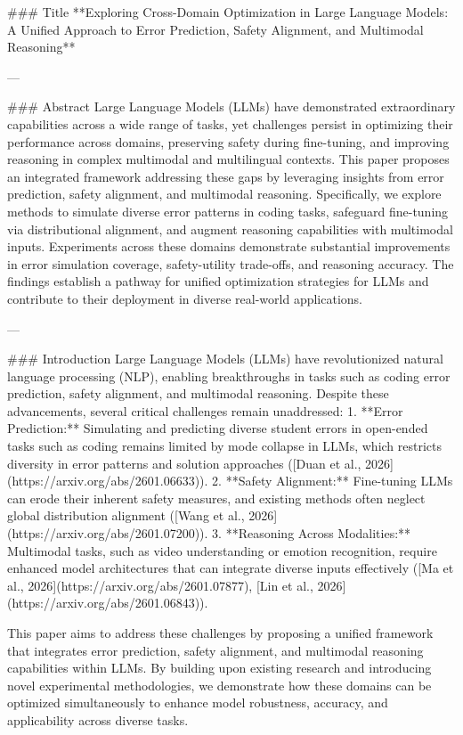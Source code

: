 ### Title  
**Exploring Cross-Domain Optimization in Large Language Models: A Unified Approach to Error Prediction, Safety Alignment, and Multimodal Reasoning**

---

### Abstract  
Large Language Models (LLMs) have demonstrated extraordinary capabilities across a wide range of tasks, yet challenges persist in optimizing their performance across domains, preserving safety during fine-tuning, and improving reasoning in complex multimodal and multilingual contexts. This paper proposes an integrated framework addressing these gaps by leveraging insights from error prediction, safety alignment, and multimodal reasoning. Specifically, we explore methods to simulate diverse error patterns in coding tasks, safeguard fine-tuning via distributional alignment, and augment reasoning capabilities with multimodal inputs. Experiments across these domains demonstrate substantial improvements in error simulation coverage, safety-utility trade-offs, and reasoning accuracy. The findings establish a pathway for unified optimization strategies for LLMs and contribute to their deployment in diverse real-world applications.  

---

### Introduction  
Large Language Models (LLMs) have revolutionized natural language processing (NLP), enabling breakthroughs in tasks such as coding error prediction, safety alignment, and multimodal reasoning. Despite these advancements, several critical challenges remain unaddressed:  
1. **Error Prediction:** Simulating and predicting diverse student errors in open-ended tasks such as coding remains limited by mode collapse in LLMs, which restricts diversity in error patterns and solution approaches ([Duan et al., 2026](https://arxiv.org/abs/2601.06633)).  
2. **Safety Alignment:** Fine-tuning LLMs can erode their inherent safety measures, and existing methods often neglect global distribution alignment ([Wang et al., 2026](https://arxiv.org/abs/2601.07200)).  
3. **Reasoning Across Modalities:** Multimodal tasks, such as video understanding or emotion recognition, require enhanced model architectures that can integrate diverse inputs effectively ([Ma et al., 2026](https://arxiv.org/abs/2601.07877), [Lin et al., 2026](https://arxiv.org/abs/2601.06843)).  

This paper aims to address these challenges by proposing a unified framework that integrates error prediction, safety alignment, and multimodal reasoning capabilities within LLMs. By building upon existing research and introducing novel experimental methodologies, we demonstrate how these domains can be optimized simultaneously to enhance model robustness, accuracy, and applicability across diverse tasks.  

